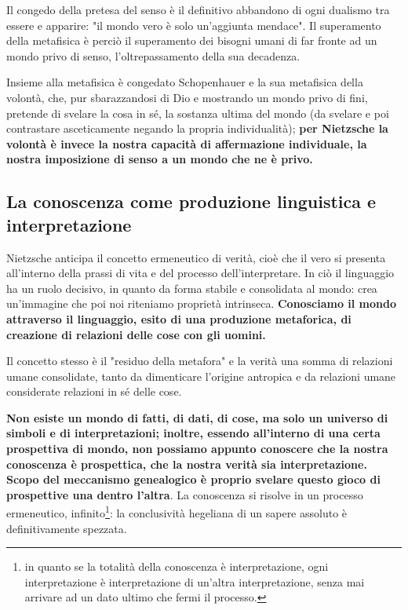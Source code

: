 Il congedo della pretesa del senso è il definitivo abbandono di  ogni dualismo tra essere e apparire: "il mondo vero è solo un'aggiunta mendace". Il superamento della metafisica è perciò il superamento dei bisogni umani di far fronte ad un mondo privo di senso, l'oltrepassamento della sua decadenza.

Insieme alla metafisica è congedato Schopenhauer e la sua metafisica della volontà, che, pur sbarazzandosi di Dio e mostrando un mondo privo di fini, pretende di svelare la cosa in sé, la sostanza ultima del mondo (da svelare e poi contrastare asceticamente negando la propria individualità); \textbf{per Nietzsche la volontà è invece la nostra capacità di affermazione individuale, la nostra imposizione di senso a un mondo che ne è privo.}

\subsection{La conoscenza come produzione linguistica e interpretazione}

Nietzsche anticipa il concetto ermeneutico di verità, cioè che il vero si presenta all'interno della prassi di vita e del processo dell'interpretare. In ciò il linguaggio ha un ruolo decisivo, in quanto da forma stabile e consolidata al mondo: crea un'immagine che poi noi riteniamo proprietà intrinseca. \textbf{Conosciamo il mondo attraverso il linguaggio, esito di una produzione metaforica, di creazione di relazioni delle cose con gli uomini.}

Il concetto stesso è il "residuo della metafora" e la verità una somma di relazioni umane consolidate, tanto da dimenticare l'origine antropica e da relazioni umane considerate relazioni in sé delle cose.

\textbf{Non esiste un mondo di fatti, di dati, di cose, ma solo un universo di simboli e di interpretazioni; inoltre, essendo all'interno di una certa prospettiva di mondo, non possiamo appunto conoscere che la nostra conoscenza è prospettica, che la nostra verità sia interpretazione. Scopo del meccanismo genealogico è proprio svelare questo gioco di prospettive una dentro l'altra}. La conoscenza si risolve in un processo ermeneutico, infinito\footnote{in quanto se la totalità della conoscenza è interpretazione, ogni interpretazione è interpretazione di un'altra interpretazione, senza mai arrivare ad un dato ultimo che fermi il processo.}: la conclusività hegeliana di un sapere assoluto è definitivamente spezzata.

